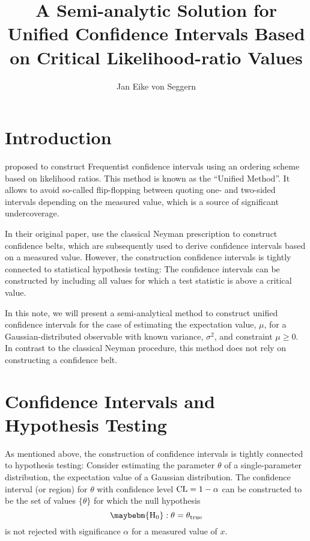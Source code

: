 \documentclass[a4paper]{article}
\title{A Semi-analytic Solution for Unified Confidence Intervals Based
on Critical Likelihood-ratio Values}
\author{Jan Eike von Seggern}
\newcommand*\Hz{\maybebm{\mathrm{H}_0}\xspace}
\begin{document}
\maketitle

\section{Introduction}

\textcite{Feldman1998} proposed to construct Frequentist confidence
intervals
using an ordering scheme based on likelihood ratios. This method is
known as the ``Unified Method''. It allows to avoid so-called
flip-flopping between quoting one- and two-sided intervals depending on
the measured value, which is a source of significant undercoverage.

In their original paper, \citeauthor{Feldman1998} use the classical
Neyman prescription to construct confidence belts, which are
subsequently used to derive confidence intervals based on a measured
value. However, the construction confidence intervals is tightly
connected to statistical hypothesis
testing\cite{wiki:confidenceinterval,Cox1974}: The confidence intervals
can be constructed by including all values for which a test statistic is
above a critical value\cite{Sen2009}.

In this note, we will present a semi-analytical method to construct
unified confidence intervals for the case of estimating the expectation
value, $\mu$, for a Gaussian-distributed observable with known variance,
$\sigma^2$, and constraint $\mu \geq 0$. In contrast to the classical
Neyman procedure, this method does not rely on constructing a confidence
belt.

\section{Confidence Intervals and Hypothesis Testing}

As mentioned above, the construction of confidence intervals is tightly
connected to hypothesis testing: Consider estimating the parameter
$\theta$ of a single-parameter distribution, \eg the expectation value
of a Gaussian distribution. The confidence interval (or region) for
$\theta$ with confidence level $\mathrm{CL} = 1-\alpha$ can be constructed to be
the set of values $\{\theta\}$ for which the null hypothesis
%
\begin{equation*}
  \Hz: \theta = \theta_\mathrm{true}
\end{equation*}
%
is not rejected with significance $\alpha$ for a measured value of $x$.
\end{document}
